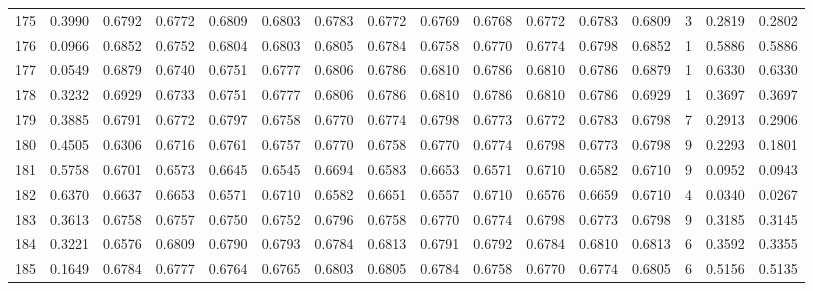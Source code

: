 \begin{tabular}{lrrrrrrrrrrrrrrr}
175 &      0.3990 &  0.6792 &  0.6772 &  0.6809 &  0.6803 &  0.6783 &  0.6772 &  0.6769 &  0.6768 &  0.6772 &   0.6783 &     0.6809 &      3 &                    0.2819 &                     0.2802 \\
176 &      0.0966 &  0.6852 &  0.6752 &  0.6804 &  0.6803 &  0.6805 &  0.6784 &  0.6758 &  0.6770 &  0.6774 &   0.6798 &     0.6852 &      1 &                    0.5886 &                     0.5886 \\
177 &      0.0549 &  0.6879 &  0.6740 &  0.6751 &  0.6777 &  0.6806 &  0.6786 &  0.6810 &  0.6786 &  0.6810 &   0.6786 &     0.6879 &      1 &                    0.6330 &                     0.6330 \\
178 &      0.3232 &  0.6929 &  0.6733 &  0.6751 &  0.6777 &  0.6806 &  0.6786 &  0.6810 &  0.6786 &  0.6810 &   0.6786 &     0.6929 &      1 &                    0.3697 &                     0.3697 \\
179 &      0.3885 &  0.6791 &  0.6772 &  0.6797 &  0.6758 &  0.6770 &  0.6774 &  0.6798 &  0.6773 &  0.6772 &   0.6783 &     0.6798 &      7 &                    0.2913 &                     0.2906 \\
180 &      0.4505 &  0.6306 &  0.6716 &  0.6761 &  0.6757 &  0.6770 &  0.6758 &  0.6770 &  0.6774 &  0.6798 &   0.6773 &     0.6798 &      9 &                    0.2293 &                     0.1801 \\
181 &      0.5758 &  0.6701 &  0.6573 &  0.6645 &  0.6545 &  0.6694 &  0.6583 &  0.6653 &  0.6571 &  0.6710 &   0.6582 &     0.6710 &      9 &                    0.0952 &                     0.0943 \\
182 &      0.6370 &  0.6637 &  0.6653 &  0.6571 &  0.6710 &  0.6582 &  0.6651 &  0.6557 &  0.6710 &  0.6576 &   0.6659 &     0.6710 &      4 &                    0.0340 &                     0.0267 \\
183 &      0.3613 &  0.6758 &  0.6757 &  0.6750 &  0.6752 &  0.6796 &  0.6758 &  0.6770 &  0.6774 &  0.6798 &   0.6773 &     0.6798 &      9 &                    0.3185 &                     0.3145 \\
184 &      0.3221 &  0.6576 &  0.6809 &  0.6790 &  0.6793 &  0.6784 &  0.6813 &  0.6791 &  0.6792 &  0.6784 &   0.6810 &     0.6813 &      6 &                    0.3592 &                     0.3355 \\
185 &      0.1649 &  0.6784 &  0.6777 &  0.6764 &  0.6765 &  0.6803 &  0.6805 &  0.6784 &  0.6758 &  0.6770 &   0.6774 &     0.6805 &      6 &                    0.5156 &                     0.5135 \\

\end{tabular}
